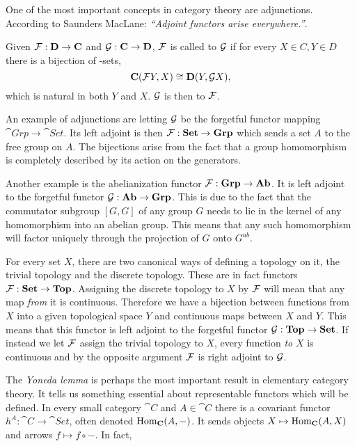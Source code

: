 \documentclass[../../main.tex]{subfiles}
\begin{document}
    One of the most important concepts in category theory are adjunctions. According to Saunders MacLane: \textit{“Adjoint functors arise everywhere.”}\cite{cate-mac}.
    
    \begin{definition}
        Given $\mathcal{F}: \mathbf{D} \to \mathbf{C}$ and $\mathcal{G}: \mathbf{C} \to \mathbf{D}$, $\mathcal{F}$ is called  to $\mathcal{G}$ if for every $X \in C, Y \in D$ there is a bijection of \Hom-sets, \[\mathbf{C}(\mathcal{F}Y, X) \cong \mathbf{D}(Y, \mathcal{G}X),\] which is natural in both $Y$ and $X$. $\mathcal{G}$ is then  to $\mathcal{F}$.
    \end{definition}
    
    An example of adjunctions are letting $\mathcal{G}$ be the forgetful functor mapping $\cat{Grp} \to \cat{Set}$. Its left adjoint is then $\mathcal{F}: \mathbf{Set} \to \mathbf{Grp}$ which sends a set $A$ to the free group on $A$. The bijections arise from the fact that a group homomorphism is completely described by its action on the generators.
    
    Another example is the abelianization functor $\mathcal{F}: \mathbf{Grp} \to \mathbf{Ab}$. It is left adjoint to the forgetful functor $\mathcal{G}: \mathbf{Ab} \to \mathbf{Grp}$. This is due to the fact that the commutator subgroup $[G, G]$ of any group $G$ needs to lie in the kernel of any homomorphism into an abelian group. This means that any such homomorphism will factor uniquely through the projection of $G$ onto $G^{ab}$.
    
    For every set $X$, there are two canonical ways of defining a topology on it, the trivial topology and the discrete topology. These are in fact functors $\mathcal{F}: \mathbf{Set} \to \mathbf{Top}$. Assigning the discrete topology to $X$ by $\mathcal{F}$ will mean that any map \emph{from} it is continuous. Therefore we have a bijection between functions from $X$ into a given topological space $Y$ and continuous maps between $X$ and $Y$. This means that this functor is left adjoint to the forgetful functor $\mathcal{G}: \mathbf{Top} \to \mathbf{Set}$. If instead we let $\mathcal{F}$ assign the trivial topology to $X$, every function \emph{to} $X$ is continuous and by the opposite argument $\mathcal{F}$ is right adjoint to $\mathcal{G}$.
    
    The \emph{Yoneda lemma} is perhaps the most important result in elementary category theory. It tells us something essential about representable functors which will be defined. In every small category $\cat{C}$ and $A \in \cat{C}$ there is a covariant functor $h^A: \cat{C} \to \cat{Set}$, often denoted $\text{Hom}_\mathbf{C}(A, -)$. It sends objects $X \mapsto \text{Hom}_\mathbf{C}(A, X)$ and arrows $f \mapsto f \circ -$. In fact, 
    
\end{document}

